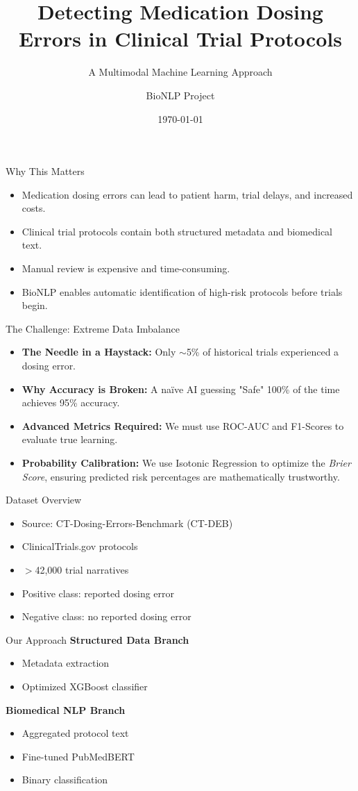 \documentclass{beamer}
\title{Detecting Medication Dosing Errors in Clinical Trial Protocols}
\subtitle{A Multimodal Machine Learning Approach}
\author{BioNLP Project}
\date{\today}
\begin{document}
\begin{frame}
\titlepage
\end{frame}

\begin{frame}{Why This Matters}
\begin{itemize}
\item Medication dosing errors can lead to patient harm, trial delays, and increased costs.
\item Clinical trial protocols contain both structured metadata and biomedical text.
\item Manual review is expensive and time-consuming.
\item BioNLP enables automatic identification of high-risk protocols before trials begin.
\end{itemize}
\end{frame}

\begin{frame}{The Challenge: Extreme Data Imbalance}
\begin{itemize}
\item \textbf{The Needle in a Haystack:} Only $\sim$5\% of historical trials experienced a dosing error.
\item \textbf{Why Accuracy is Broken:} A naïve AI guessing "Safe" 100\% of the time achieves 95\% accuracy.
\item \textbf{Advanced Metrics Required:} We must use ROC-AUC and F1-Scores to evaluate true learning.
\item \textbf{Probability Calibration:} We use Isotonic Regression to optimize the \textit{Brier Score}, ensuring predicted risk percentages are mathematically trustworthy.
\end{itemize}
\end{frame}

\begin{frame}{Dataset Overview}
\begin{itemize}
\item Source: CT-Dosing-Errors-Benchmark (CT-DEB)
\item ClinicalTrials.gov protocols
\item $>$42,000 trial narratives
\item Positive class: reported dosing error
\item Negative class: no reported dosing error
\end{itemize}
\end{frame}

\begin{frame}{Our Approach}
\textbf{Structured Data Branch}
\begin{itemize}
\item Metadata extraction
\item Optimized XGBoost classifier
\end{itemize}

\textbf{Biomedical NLP Branch}
\begin{itemize}
\item Aggregated protocol text
\item Fine-tuned PubMedBERT
\item Binary classification
\end{itemize}
\end{frame}
\end{document}
